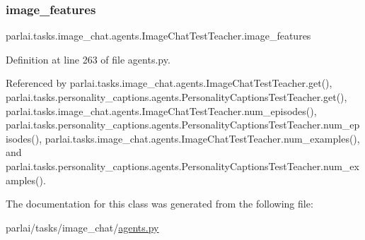 \subsubsection{\texorpdfstring{image\+\_\+features}{image\_features}}
{\footnotesize\ttfamily parlai.\+tasks.\+image\+\_\+chat.\+agents.\+Image\+Chat\+Test\+Teacher.\+image\+\_\+features}



Definition at line 263 of file agents.\+py.



Referenced by parlai.\+tasks.\+image\+\_\+chat.\+agents.\+Image\+Chat\+Test\+Teacher.\+get(), parlai.\+tasks.\+personality\+\_\+captions.\+agents.\+Personality\+Captions\+Test\+Teacher.\+get(), parlai.\+tasks.\+image\+\_\+chat.\+agents.\+Image\+Chat\+Test\+Teacher.\+num\+\_\+episodes(), parlai.\+tasks.\+personality\+\_\+captions.\+agents.\+Personality\+Captions\+Test\+Teacher.\+num\+\_\+episodes(), parlai.\+tasks.\+image\+\_\+chat.\+agents.\+Image\+Chat\+Test\+Teacher.\+num\+\_\+examples(), and parlai.\+tasks.\+personality\+\_\+captions.\+agents.\+Personality\+Captions\+Test\+Teacher.\+num\+\_\+examples().



The documentation for this class was generated from the following file\+:\begin{DoxyCompactItemize}
\item 
parlai/tasks/image\+\_\+chat/\hyperlink{parlai_2tasks_2image__chat_2agents_8py}{agents.\+py}\end{DoxyCompactItemize}
